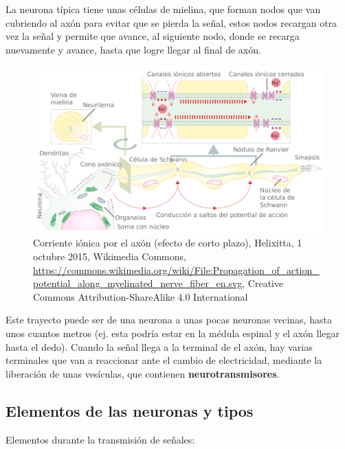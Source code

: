 La neurona típica tiene unas células de mielina, que forman nodos que van cubriendo al axón para evitar que se pierda la señal, estos nodos recargan otra vez la señal y permite que avance, al siguiente nodo, donde se recarga  nuevamente y avance, hasta que logre llegar al final de axón.


\begin{figure}[h]
 \centering
 \includegraphics[scale=0.1]{../Figuras/Saltos.png}
 \caption{Corriente iónica por el axón (efecto de corto plazo), Helixitta, 1 octubre 2015, Wikimedia Commons, \url{https://commons.wikimedia.org/wiki/File:Propagation_of_action_potential_along_myelinated_nerve_fiber_en.svg}, Creative Commons Attribution-ShareAlike 4.0 International}
 \label{fig:conduccionSaltos}
\end{figure}


Este trayecto puede ser de una neurona a unas pocas neuronas vecinas, hasta unos cuantos metros (ej. esta podría estar en la médula espinal y el axón llegar hasta el dedo). Cuando la señal llega a la terminal de el axón, hay varias terminales que van a reaccionar ante el cambio de electricidad, mediante la liberación de unas vesículas, que contienen \textbf{neurotransmisores}.




\subsection{Elementos de las neuronas y tipos}


Elementos durante la transmisión de señales:


